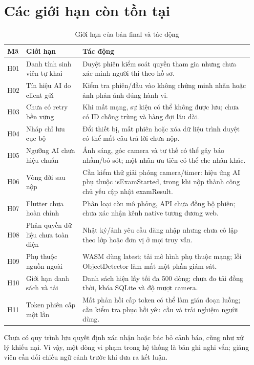 \section{Các giới hạn còn tồn tại}
\begin{longtable}{@{}L{1cm}L{4.5cm}L{9cm}@{}}
\caption{Giới hạn của bản final và tác động}\\
\toprule Mã & Giới hạn & Tác động \\\midrule\endhead
H01 & Danh tính sinh viên tự khai & Duyệt phiên kiểm soát quyền tham gia nhưng chưa xác minh người thi theo hồ sơ.\\
H02 & Tín hiệu AI do client gửi & Kiểm tra phiên/đầu vào không chứng minh nhãn hoặc ảnh phản ánh đúng hành vi.\\
H03 & Chưa có retry bền vững & Khi mất mạng, sự kiện có thể không được lưu; chưa có ID chống trùng và hàng đợi lâu dài.\\
H04 & Nháp chỉ lưu cục bộ & Đổi thiết bị, mất phiên hoặc xóa dữ liệu trình duyệt có thể mất câu trả lời chưa nộp.\\
H05 & Ngưỡng AI chưa hiệu chuẩn & Ánh sáng, góc camera và tư thế có thể gây báo nhầm/bỏ sót; một nhãn ưu tiên có thể che nhãn khác.\\
H06 & Vòng đời sau nộp & Cần kiểm thử giải phóng camera/timer: hiệu ứng AI phụ thuộc isExamStarted, trong khi nộp thành công chủ yếu cập nhật examResult.\\
H07 & Flutter chưa hoàn chỉnh & Phân loại còn mô phỏng, API chưa đồng bộ phiên; chưa xác nhận kênh native tương đương web.\\
H08 & Phân quyền dữ liệu chưa toàn diện & Nhật ký/ảnh yêu cầu đăng nhập nhưng chưa cô lập theo lớp hoặc đơn vị ở mọi truy vấn.\\
H09 & Phụ thuộc nguồn ngoài & WASM dùng latest; tải mô hình phụ thuộc mạng; lỗi ObjectDetector làm mất một phần giám sát.\\
H10 & Giới hạn danh sách và tải & Danh sách hiện lấy tối đa 500 dòng; chưa đo tải đồng thời, khóa SQLite và độ mượt camera.\\
H11 & Token phiên cấp một lần & Mất phản hồi cấp token có thể làm gián đoạn luồng; cần kiểm tra phục hồi yêu cầu và trải nghiệm người dùng.\\
\bottomrule
\end{longtable}

Chưa có quy trình lưu quyết định xác nhận hoặc bác bỏ cảnh báo, cũng như xử lý khiếu nại. Vì vậy, một dòng vi phạm trong hệ thống là bản ghi nghi vấn; giảng viên cần đối chiếu ngữ cảnh trước khi đưa ra kết luận.


